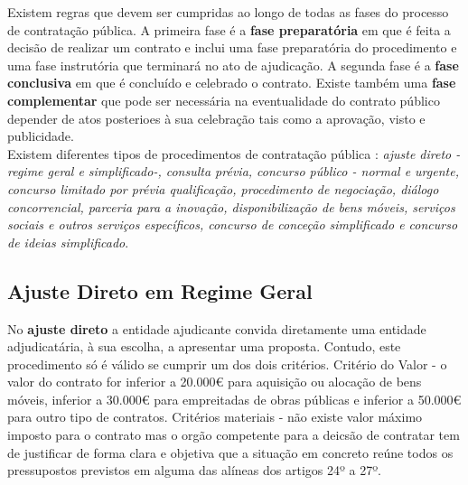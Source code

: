 \documentclass{book}
\begin{document}
	Existem regras que devem ser cumpridas ao longo de todas as fases do processo de contratação pública. A primeira fase é a \textbf{fase preparatória} em que é feita a decisão de realizar um contrato e inclui uma fase preparatória do procedimento e uma fase instrutória que terminará no ato de ajudicação. A segunda fase é a \textbf{fase conclusiva} em que é concluído e celebrado o contrato. Existe também uma \textbf{fase complementar} que pode ser necessária na eventualidade do contrato público depender de atos posterioes à sua celebração tais como a aprovação, visto e publicidade. \\
	
	Existem diferentes tipos de procedimentos de contratação pública : \textit{ajuste direto - regime geral e simplificado-, consulta prévia, concurso público - normal e urgente, concurso limitado por prévia qualificação, procedimento de negociação, diálogo concorrencial, parceria para a inovação, disponibilização de bens móveis, serviços sociais e outros serviços específicos, concurso de conceção simplificado e concurso de ideias simplificado}.\\
	
	
	\newpage
	\subsection*{Ajuste Direto em Regime Geral}
	
	No \textbf{ajuste direto} a entidade ajudicante convida diretamente uma entidade adjudicatária, à sua escolha, a apresentar uma proposta. Contudo, este procedimento só é válido se cumprir um dos dois critérios.  Critério do Valor -  o valor do contrato for inferior a 20.000€ para aquisição ou alocação de bens móveis, inferior a 30.000€ para empreitadas de obras públicas e inferior a 50.000€ para outro tipo de contratos. Critérios materiais - não existe valor máximo imposto para o contrato mas o orgão competente para a deicsão de contratar tem de justificar de forma clara e objetiva que a situação em concreto reúne todos os pressupostos previstos em alguma das alíneas dos artigos 24º a 27º. 
	
\end{document}
